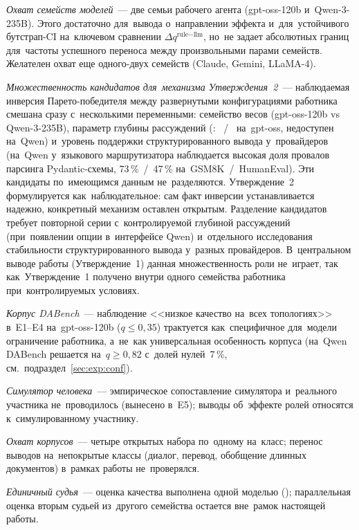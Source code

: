 \emph{Охват семейств моделей}~--- две семьи рабочего агента
(gpt-oss-120b и~Qwen-3-235B). Этого достаточно для~вывода
о~направлении эффекта и~для~устойчивого бутстрап-CI на~ключевом
сравнении $\Delta q^{\text{rule}-\text{llm}}$, но~не задает
абсолютных границ для~частоты успешного переноса между произвольными
парами семейств. Желателен охват еще одного-двух семейств (Claude,
Gemini, LLaMA-4).

\emph{Множественность кандидатов для~механизма Утверждения~2}~---
наблюдаемая инверсия Парето-победителя между развернутыми
конфигурациями работника смешана сразу с~несколькими переменными:
семейство весов (gpt-oss-120b vs Qwen-3-235B), параметр глубины
рассуждений (: ~/~
на~gpt-oss, недоступен на~Qwen) и~уровень поддержки структурированного
вывода у~провайдеров (на~Qwen у~языкового маршрутизатора наблюдается
высокая доля провалов парсинга Pydantic-схемы, 73\,\%~/~47\,\%
на~GSM8K~/~HumanEval). Эти кандидаты по~имеющимся данным
не~разделяются. Утверждение~2 формулируется как~наблюдательное:
сам факт инверсии устанавливается надежно, конкретный механизм
оставлен открытым. Разделение кандидатов требует повторной серии
с~контролируемой глубиной рассуждений (при~появлении опции
в~интерфейсе Qwen) и~отдельного исследования стабильности
структурированного вывода у~разных провайдеров. В~центральном
выводе работы (Утверждение~1) данная множественность роли
не~играет, так как~Утверждение~1 получено внутри одного семейства
работника при~контролируемых условиях.

\emph{Корпус DABench}~--- наблюдение <<низкое качество на~всех
топологиях>> в~E1--E4 на~gpt-oss-120b ($q\le0{,}35$) трактуется
как~специфичное для~модели ограничение работника, а~не~как универсальная
особенность корпуса (на~Qwen DABench решается на~$q\ge0{,}82$
с~долей нулей~7\,\%, см.~подраздел~\ref{sec:exp:conf}).

\emph{Симулятор человека}~--- эмпирическое сопоставление симулятора
и~реального участника не~проводилось (вынесено в~E5); выводы
об~эффекте ролей относятся к~симулированному участнику.

\emph{Охват корпусов}~--- четыре открытых набора по~одному
на~класс; перенос выводов на~непокрытые классы (диалог, перевод,
обобщение длинных документов) в~рамках работы не~проверялся.

\emph{Единичный судья}~--- оценка качества выполнена одной моделью
(); параллельная оценка вторым судьей
из~другого семейства остается вне~рамок настоящей работы.

